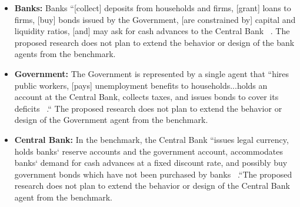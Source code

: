 \documentclass[11pt]{article}
\begin{document}
\begin{itemize}
 \item \textbf{Banks:} Banks ``[collect] deposits from households and firms,
 [grant] loans to firms, [buy] bonds issued by the Government, [are constrained by]
 capital and liquidity ratios, [and] may ask for cash advances to the Central Bank  ~\cite{Caiani-benchmark-paper}.
 The proposed research does not plan to extend the behavior or design of the bank
 agents from the benchmark.
 \item \textbf{Government:} The Government is represented by a single agent that
 ``hires public workers, [pays] unemployment benefits to households...holds an
 account at the Central Bank, collects taxes, and issues bonds to cover its deficits
  ~\cite{Caiani-benchmark-paper}.`` The proposed research does not plan to extend
   the behavior or design of the Government agent from the benchmark.
\item \textbf{Central Bank:} In the benchmark, the Central Bank ``issues legal
currency, holds banks` reserve accounts and the government account, accommodates
banks` demand for cash advances at a fixed discount rate, and possibly buy
government bonds which have not been purchased by banks
~\cite{Caiani-benchmark-paper}.``The proposed research does not plan to
extend the behavior or design of the Central Bank agent from the benchmark.
\end{itemize}
\end{document}
